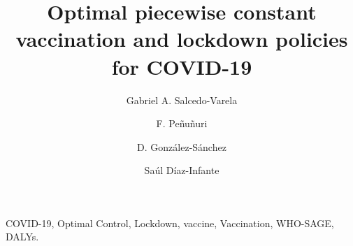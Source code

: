 \begin{frontmatter}
    \title{
        Optimal piecewise constant vaccination and lockdown
        policies for COVID-19
    }
    \author[add:unison]%
    {Gabriel A. Salcedo-Varela
    }
    \address[add:unison]{
        Departamento de Matem\'aticas, Universidad de Sonora,
        Blvd. Luis Encinas y Rosales S/N,
        Hermosillo, Sonora, M\'exico, C.P. 83000.
    }
    \author[add:UADY]%
    {F. Pe\~nu\~nuri}
    \address[add:UADY]{Facultad de Ingenier\'ia, Universidad
    Aut\'onoma de Yucat\'an, A.P. 150, Cordemex, M\'erida, Yucat\'an,
    M\'exico.}
    \author[add:conacyt_unison]{D. Gonz\'alez-S\'anchez}
        \address[add:conacyt_unison]{
        CONACYT-Universidad de Sonora,
        Departamento de Matem\'aticas,
        Blvd. Luis Encinas y Rosales S/N,
        Hermosillo, Sonora, M\'exico, C.P. 83000.
    }
    \author[add:conacyt_unison]{%
        Sa\'ul D\'iaz-Infante%
    }%
    \begin{keyword}
        COVID-19, Optimal Control, Lockdown, vaccine,
        Vaccination, WHO-SAGE, DALYs.
    \end{keyword}
    
\end{frontmatter}